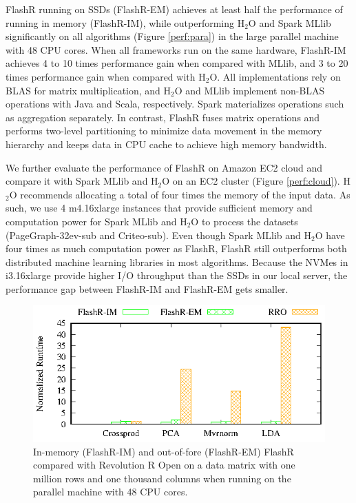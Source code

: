 FlashR running on SSDs (FlashR-EM) achieves at least half the performance of
running in memory (FlashR-IM),
while outperforming H$_2$O and Spark MLlib significantly on all algorithms
(Figure \ref{perf:para}) in the large parallel machine with 48 CPU cores.
When all frameworks run on the same hardware, FlashR-IM achieves 4 to 10 times
performance gain when compared
with MLlib, and 3 to 20 times performance gain when compared with H$_2$O.
All implementations rely on BLAS for matrix multiplication, and H$_2$O
and MLlib implement non-BLAS operations with Java and Scala, respectively.
Spark materializes operations such as aggregation separately. In contrast,
FlashR fuses matrix operations and performs two-level partitioning to
minimize data movement in the memory hierarchy and keeps data in CPU cache
to achieve high memory bandwidth.

We further evaluate the performance of FlashR on Amazon EC2 cloud and compare it
with Spark MLlib and H$_2$O on an EC2 cluster (Figure \ref{perf:cloud}). H$_2$O
recommends
allocating a total of four times the memory of the input data. As such, we use
4 m4.16xlarge instances that provide sufficient memory and computation power for
Spark MLlib and H$_2$O to process the datasets (PageGraph-32ev-sub and Criteo-sub).
Even though Spark MLlib and H$_2$O have four times as much computation power as FlashR,
FlashR still outperforms both distributed machine learning libraries in most algorithms.
Because the NVMes in i3.16xlarge provide higher I/O throughput than the SSDs
in our local server, the performance gap between FlashR-IM and FlashR-EM gets
smaller.

\begin{figure}[b]
  \vspace{-10pt}
	\begin{center}
		\footnotesize
		\includegraphics{FlashMatrix_figs/FlashR-vs-RRO.eps}
		\vspace{-10pt}
		\caption{In-memory (FlashR-IM) and out-of-fore (FlashR-EM) FlashR
		compared with Revolution R Open on a data matrix with one million rows
		and one thousand columns when running on the parallel machine with
		48 CPU cores.}
		\label{fig:fmR}
	\end{center}
  \vspace{-15pt}
\end{figure}

